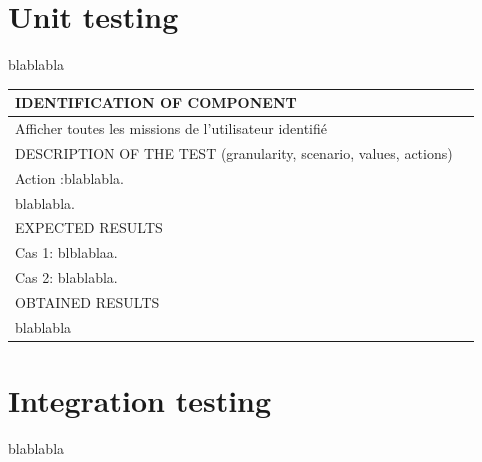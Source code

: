 \documentclass{polytech/polytech}
\numberwithin{figure}{chapter}
\begin{document}
\begin{appendix}
\section{Unit testing}

blablabla

\begin{table}[]
\begin{tabular}{|l|l|}\hline
\color{C} IDENTIFICATION OF COMPONENT \\\hline
Afficher toutes les missions de l'utilisateur identifié  \\\hline
\color{C} DESCRIPTION OF THE TEST (granularity, scenario, values, actions) \\\hline
Action :blablabla.\\ blablabla. \\\hline
\color{C} EXPECTED RESULTS \\\hline
Cas 1: blblablaa.\\ Cas 2: blablabla. \\\hline
\color{C} OBTAINED RESULTS \\\hline
blablabla \\\hline
\end{tabular}
\end{table}                                                                             

\section{Integration testing}

blablabla

\end{appendix}
\end{document}
